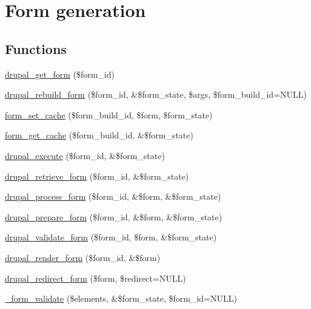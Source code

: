 \hypertarget{group__form__api}{
\section{Form generation}
\label{group__form__api}
}
\subsection*{Functions}
\begin{CompactItemize}
\item 
\hyperlink{group__form__api_g720df81a837b06dfe19daf1c1eea3437}{drupal\_\-get\_\-form} (\$form\_\-id)
\item 
\hyperlink{group__form__api_g31c0f01e4157f02cc01a0c5d12d60b09}{drupal\_\-rebuild\_\-form} (\$form\_\-id, \&\$form\_\-state, \$args, \$form\_\-build\_\-id=NULL)
\item 
\hyperlink{group__form__api_g274fe9a7fe000a43b7f173e3b54dae7f}{form\_\-set\_\-cache} (\$form\_\-build\_\-id, \$form, \$form\_\-state)
\item 
\hyperlink{group__form__api_gb1da3001a3773a949188b52f61a9cd09}{form\_\-get\_\-cache} (\$form\_\-build\_\-id, \&\$form\_\-state)
\item 
\hyperlink{group__form__api_g06dfc84042a094ae6b40bc1840ccced8}{drupal\_\-execute} (\$form\_\-id, \&\$form\_\-state)
\item 
\hyperlink{group__form__api_g82f16e1c86833aa88bf93adf93bae9bb}{drupal\_\-retrieve\_\-form} (\$form\_\-id, \&\$form\_\-state)
\item 
\hyperlink{group__form__api_g61186f5c43533761544a778918818fd2}{drupal\_\-process\_\-form} (\$form\_\-id, \&\$form, \&\$form\_\-state)
\item 
\hyperlink{group__form__api_g79309515217249c16c7e4a7117141120}{drupal\_\-prepare\_\-form} (\$form\_\-id, \&\$form, \&\$form\_\-state)
\item 
\hyperlink{group__form__api_gc650d688c949f726c59ab59e2d526ef8}{drupal\_\-validate\_\-form} (\$form\_\-id, \$form, \&\$form\_\-state)
\item 
\hyperlink{group__form__api_gdd3fcf38a3d6fdcd11c58a6a48b4bd37}{drupal\_\-render\_\-form} (\$form\_\-id, \&\$form)
\item 
\hyperlink{group__form__api_gd2d616d098fbfd438466abe52136d660}{drupal\_\-redirect\_\-form} (\$form, \$redirect=NULL)
\item 
\hyperlink{group__form__api_g34ca9a4baf78b6f550e792893c4dfda9}{\_\-form\_\-validate} (\$elements, \&\$form\_\-state, \$form\_\-id=NULL)

\end{CompactItemize}
